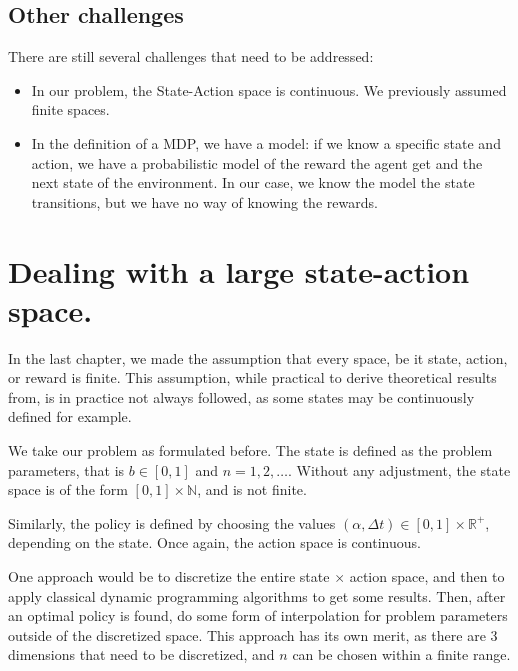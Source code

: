 \documentclass[
  letterpaper,
]{report}
\providecommand{\tightlist}{%
  \setlength{\itemsep}{0pt}\setlength{\parskip}{0pt}}\usepackage{longtable,booktabs,array}
\theoremstyle{definition}
\theoremstyle{plain}
\theoremstyle{definition}
\theoremstyle{remark}
\begin{document}
\subsection*{Other challenges}\label{other-challenges}

There are still several challenges that need to be addressed:

\begin{itemize}
\tightlist
\item
  In our problem, the State-Action space is continuous. We previously
  assumed finite spaces.
\item
  In the definition of a MDP, we have a model: if we know a specific
  state and action, we have a probabilistic model of the reward the
  agent get and the next state of the environment. In our case, we know
  the model the state transitions, but we have no way of knowing the
  rewards.
\end{itemize}

\section{Dealing with a large state-action
space.}\label{dealing-with-a-large-state-action-space.}

In the last chapter, we made the assumption that every space, be it
state, action, or reward is finite. This assumption, while practical to
derive theoretical results from, is in practice not always followed, as
some states may be continuously defined for example.

We take our problem as formulated before. The state is defined as the
problem parameters, that is \(b\in[0,1]\) and \(n = 1 , 2, \dots\).
Without any adjustment, the state space is of the form
\([0,1] \times \mathbb{N}\), and is not finite.

Similarly, the policy is defined by choosing the values
\((\alpha,\Delta t) \in [0,1]\times \mathbb{R}^+\), depending on the
state. Once again, the action space is continuous.

One approach would be to discretize the entire state \(\times\) action
space, and then to apply classical dynamic programming algorithms to get
some results. Then, after an optimal policy is found, do some form of
interpolation for problem parameters outside of the discretized space.
This approach has its own merit, as there are 3 dimensions that need to
be discretized, and \(n\) can be chosen within a finite range.
\end{document}
